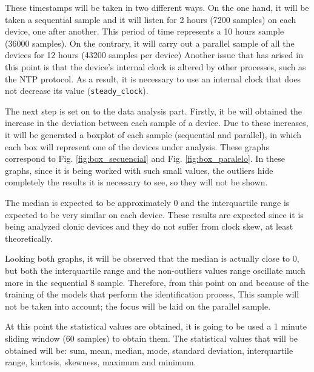 These timestamps will be taken in two different ways. On the one hand, it will be taken a sequential sample and it will listen for 2 hours (7200 samples) on each device, one after another. This period of time represents a 10 hours sample (36000 samples). On the contrary, it will carry out a parallel sample of all the devices for 12 hours (43200 samples per device) Another issue that has arised in this point is that the device's internal clock is altered by other processes, such as the NTP protocol. As a result, it is necessary to use an internal clock that does not decrease its value (\texttt{steady\_clock}). 


The next step is set on to the data analysis part. Firstly, it be will obtained the increase in the deviation between each sample of a device. Due to these increases, it will be generated a boxplot of each sample (sequential and parallel), in which each box will represent one of the devices under analysis. These graphs correspond to Fig. \ref{fig:box_secuencial} and Fig. \ref{fig:box_paralelo}. In these graphs, since it is being worked with such small values, the outliers hide completely the results it is necessary to see, so they will not be shown. 


The median is expected to be approximately 0 and the interquartile range is expected to be very similar on each device. These results are expected since it is being analyzed clonic devices and they do not suffer from clock skew, at least theoretically.


Looking both graphs, it will be observed that the median is actually close to 0, but both the interquartile range and the non-outliers values range oscillate much more in the sequential 8 sample. Therefore, from this point on and because of the training of the models that perform the identification process, This sample will not be taken into account; the focus will be laid on the parallel sample. 


At this point the statistical values are obtained, it is going to be used a 1 minute sliding window (60 samples) to obtain them. The statistical values that will be obtained will be: sum, mean, median, mode, standard deviation, interquartile range, kurtosis, skewness, maximum and minimum.


